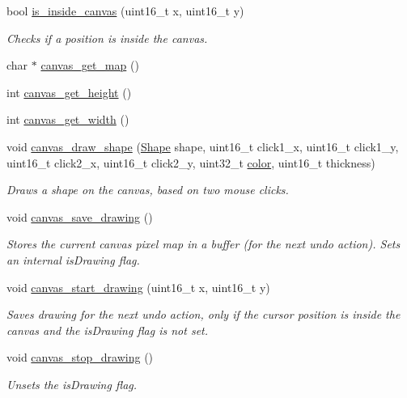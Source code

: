 \begin{DoxyCompactItemize}
bool \mbox{\hyperlink{group__canvas_ga85fca0492c1f7ec8e1d20a9b5e48be1c}{is\+\_\+inside\+\_\+canvas}} (uint16\+\_\+t x, uint16\+\_\+t y)
\begin{DoxyCompactList}\small\item\em Checks if a position is inside the canvas. \end{DoxyCompactList}\item 
char $\ast$ \mbox{\hyperlink{group__canvas_gaa7891435582c7691d473ac6532e497a9}{canvas\+\_\+get\+\_\+map}} ()
\item 
int \mbox{\hyperlink{group__canvas_gac9eac428cd153893841c96d6a9ce982a}{canvas\+\_\+get\+\_\+height}} ()
\item 
int \mbox{\hyperlink{group__canvas_gaa5703f24ea2a8ec8bee2c73225c39553}{canvas\+\_\+get\+\_\+width}} ()
\item 
void \mbox{\hyperlink{group__canvas_ga62d3a3d77148b1c1ce74a7fd960601f8}{canvas\+\_\+draw\+\_\+shape}} (\mbox{\hyperlink{group__canvas_ga55b506070847a13554f8b879c1bfb37c}{Shape}} shape, uint16\+\_\+t click1\+\_\+x, uint16\+\_\+t click1\+\_\+y, uint16\+\_\+t click2\+\_\+x, uint16\+\_\+t click2\+\_\+y, uint32\+\_\+t \mbox{\hyperlink{structcolor}{color}}, uint16\+\_\+t thickness)
\begin{DoxyCompactList}\small\item\em Draws a shape on the canvas, based on two mouse clicks. \end{DoxyCompactList}\item 
void \mbox{\hyperlink{group__canvas_ga3c9ed75a75ae36bc6fc7591952fccf17}{canvas\+\_\+save\+\_\+drawing}} ()
\begin{DoxyCompactList}\small\item\em Stores the current canvas pixel map in a buffer (for the next undo action). Sets an internal is\+Drawing flag. \end{DoxyCompactList}\item 
void \mbox{\hyperlink{group__canvas_ga3a6a181542db6b70c3aadc411073943d}{canvas\+\_\+start\+\_\+drawing}} (uint16\+\_\+t x, uint16\+\_\+t y)
\begin{DoxyCompactList}\small\item\em Saves drawing for the next undo action, only if the cursor position is inside the canvas and the is\+Drawing flag is not set. \end{DoxyCompactList}\item 
void \mbox{\hyperlink{group__canvas_ga95994c1c125e70ef4d9380e80ed9c3ab}{canvas\+\_\+stop\+\_\+drawing}} ()
\begin{DoxyCompactList}\small\item\em Unsets the is\+Drawing flag. \end{DoxyCompactList}\item 

\end{DoxyCompactItemize}

